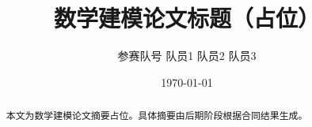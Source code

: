 \documentclass[12pt,a4paper]{ctexart}
\title{数学建模论文标题（占位）}
\author{参赛队号 \quad 队员1 \quad 队员2 \quad 队员3}
\date{\today}
\begin{document}
\maketitle
\thispagestyle{empty}

\begin{abstract}
本文为数学建模论文摘要占位。具体摘要由后期阶段根据合同结果生成。
\end{abstract}

\newpage
\tableofcontents
\newpage








\newpage



% 
\end{document}
